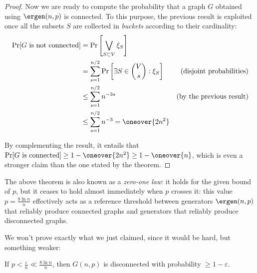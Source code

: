 \begin{proof}
    Now we are ready to compute the probability that a graph $G$ obtained using $\ergen(n, p)$ is connected. To this purpose, the previous result is exploited once all the subsets $S$ are collected in \emph{buckets} according to their cardinality:
    \begin{align*}
        \Pr[G \text{ is not connected}] &= \Pr\left[\bigvee_{S \subset V} \xi_S\right]       & \\
        &= \sum_{s = 1}^{n/2}\Pr\left[\exists S \in \binom{V}{s} : \xi_S\right]     & \text{(disjoint probabilities)}\\
        &\leq \sum_{s = 1}^{n/2} n^{-3s}                                            & \text{(by the previous result)}\\
        &\leq \sum_{s = 1}^{n/2} n^{-3} = \oneover{2n^2}                            &
    \end{align*}
    
   By complementing the result, it entails that $\Pr[G \text{ is connected}] \geq 1 - \oneover{2n^2} \geq 1 - \oneover{n}$, which is even a stronger claim than the one stated by the theorem.
\end{proof}

The above theorem is also known as a \emph{zero-one law}: it holds for the given bound of $p$, but it ceases to hold almost immediately when $p$ crosses it: this value $p = \frac{8 \ln n}{n}$ effectively acts as a reference threshold between generators $\ergen(n, p)$ that reliably produce connected graphs and generators that reliably produce disconnected graphs.

We won't prove exactly what we just claimed, since it would be hard, but something weaker:
\begin{thm}
    If $p < \frac{\varepsilon}{n} \ll \frac{8 \ln n}{n}$, then $G(n, p)$ is disconnected with probability $\geq 1 - \varepsilon$.
\end{thm}

